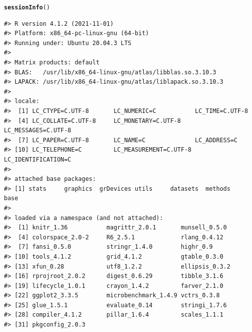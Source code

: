 \documentclass{article}\usepackage[]{graphicx}\usepackage{xcolor}
\makeatletter
\newcommand{\hlstd}[1]{\textcolor[rgb]{0.345,0.345,0.345}{#1}}%
\newcommand{\hlkwd}[1]{\textcolor[rgb]{0.737,0.353,0.396}{\textbf{#1}}}%
\newenvironment{kframe}{%
 \def\at@end@of@kframe{}%
 \ifinner\ifhmode%
  \def\at@end@of@kframe{\end{minipage}}%
  \begin{minipage}{\columnwidth}%
 \fi\fi%
 \def\FrameCommand##1{\hskip\@totalleftmargin \hskip-\fboxsep
 \colorbox{shadecolor}{##1}\hskip-\fboxsep
     \hskip-\linewidth \hskip-\@totalleftmargin \hskip\columnwidth}%
 \MakeFramed {\advance\hsize-\width
   \@totalleftmargin\z@ \linewidth\hsize
   \@setminipage}}%
 {\par\unskip\endMakeFramed%
 \at@end@of@kframe}
\newenvironment{knitrout}{}{} %
\makeatother
\begin{document}
\begin{knitrout}
\color{fgcolor}\begin{kframe}
\begin{alltt}
\hlkwd{sessionInfo}\hlstd{()}
\end{alltt}
\begin{verbatim}
#> R version 4.1.2 (2021-11-01)
#> Platform: x86_64-pc-linux-gnu (64-bit)
#> Running under: Ubuntu 20.04.3 LTS
#> 
#> Matrix products: default
#> BLAS:   /usr/lib/x86_64-linux-gnu/atlas/libblas.so.3.10.3
#> LAPACK: /usr/lib/x86_64-linux-gnu/atlas/liblapack.so.3.10.3
#> 
#> locale:
#>  [1] LC_CTYPE=C.UTF-8       LC_NUMERIC=C           LC_TIME=C.UTF-8       
#>  [4] LC_COLLATE=C.UTF-8     LC_MONETARY=C.UTF-8    LC_MESSAGES=C.UTF-8   
#>  [7] LC_PAPER=C.UTF-8       LC_NAME=C              LC_ADDRESS=C          
#> [10] LC_TELEPHONE=C         LC_MEASUREMENT=C.UTF-8 LC_IDENTIFICATION=C   
#> 
#> attached base packages:
#> [1] stats     graphics  grDevices utils     datasets  methods   base     
#> 
#> loaded via a namespace (and not attached):
#>  [1] knitr_1.36           magrittr_2.0.1       munsell_0.5.0       
#>  [4] colorspace_2.0-2     R6_2.5.1             rlang_0.4.12        
#>  [7] fansi_0.5.0          stringr_1.4.0        highr_0.9           
#> [10] tools_4.1.2          grid_4.1.2           gtable_0.3.0        
#> [13] xfun_0.28            utf8_1.2.2           ellipsis_0.3.2      
#> [16] rprojroot_2.0.2      digest_0.6.29        tibble_3.1.6        
#> [19] lifecycle_1.0.1      crayon_1.4.2         farver_2.1.0        
#> [22] ggplot2_3.3.5        microbenchmark_1.4.9 vctrs_0.3.8         
#> [25] glue_1.5.1           evaluate_0.14        stringi_1.7.6       
#> [28] compiler_4.1.2       pillar_1.6.4         scales_1.1.1        
#> [31] pkgconfig_2.0.3
\end{verbatim}
\end{kframe}
\end{knitrout}
\end{document}
